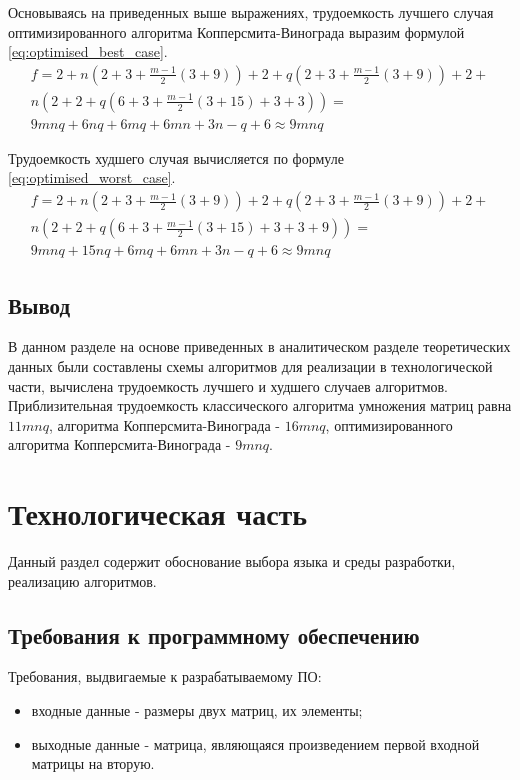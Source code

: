 \documentclass[a4paper,oneside,14pt]{extreport}
\begin{document}
Основываясь на приведенных выше выражениях, трудоемкость лучшего случая оптимизированного алгоритма Копперсмита-Винограда выразим формулой \ref{eq:optimised_best_case}.
\begin{equation} \label{eq:optimised_best_case}
\begin{array}{ll}
f = 2 + n(2 + 3 + \frac{m-1}{2}(3 + 9)) + 2 + q(2 + 3 + \frac{m-1}{2}(3 + 9)) + 2 + \\
n(2 + 2 + q(6 + 3 + \frac{m-1}{2}(3 + 15) + 3 + 3)) =\\
 9mnq + 6nq + 6mq + 6mn+3n-q+6 \approx 9mnq
\end{array}
\end{equation}

Трудоемкость худшего случая вычисляется по формуле \ref{eq:optimised_worst_case}.
\begin{equation} \label{eq:optimised_worst_case}
\begin{array}{ll}
f = 2 + n(2 + 3 + \frac{m-1}{2}(3 + 9)) + 2 + q(2 + 3 + \frac{m-1}{2}(3 + 9)) + 2 + \\
n(2 + 2 + q(6 + 3 + \frac{m-1}{2}(3 + 15) + 3 + 3 + 9)) = \\
9mnq+15nq+6mq+6mn+3n-q+6\approx 9mnq
\end{array}
\end{equation}


\section{Вывод}
В данном разделе на основе приведенных в аналитическом разделе теоретических данных были составлены схемы алгоритмов для реализации в технологической части, вычислена трудоемкость лучшего и худшего случаев алгоритмов. Приблизительная трудоемкость классического алгоритма умножения матриц равна $11mnq$, алгоритма Копперсмита-Винограда - $16mnq$, оптимизированного алгоритма Копперсмита-Винограда - $9mnq$.
\newpage

\chapter{Технологическая часть}
Данный раздел содержит обоснование выбора языка и среды разработки, реализацию алгоритмов.

\section{Требования к программному обеспечению}
Требования, выдвигаемые к разрабатываемому ПО:
\begin{itemize}
	\item входные данные - размеры двух матриц, их элементы;
	\item выходные данные - матрица, являющаяся произведением первой входной матрицы на вторую.
\end{itemize}
\end{document}

